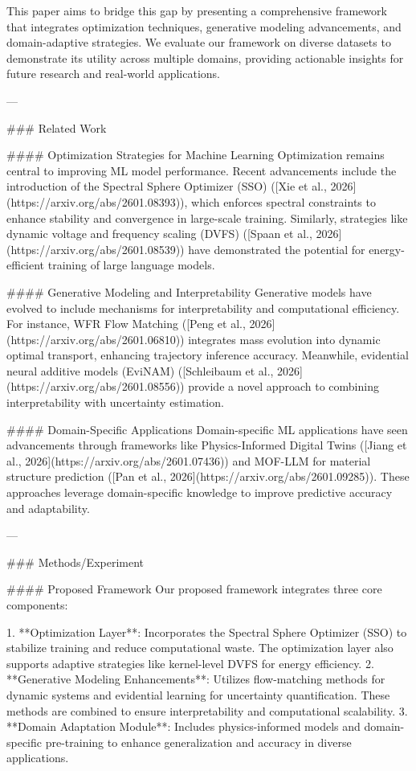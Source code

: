 This paper aims to bridge this gap by presenting a comprehensive framework that integrates optimization techniques, generative modeling advancements, and domain-adaptive strategies. We evaluate our framework on diverse datasets to demonstrate its utility across multiple domains, providing actionable insights for future research and real-world applications.

---

### Related Work

#### Optimization Strategies for Machine Learning
Optimization remains central to improving ML model performance. Recent advancements include the introduction of the Spectral Sphere Optimizer (SSO) ([Xie et al., 2026](https://arxiv.org/abs/2601.08393)), which enforces spectral constraints to enhance stability and convergence in large-scale training. Similarly, strategies like dynamic voltage and frequency scaling (DVFS) ([Spaan et al., 2026](https://arxiv.org/abs/2601.08539)) have demonstrated the potential for energy-efficient training of large language models.

#### Generative Modeling and Interpretability
Generative models have evolved to include mechanisms for interpretability and computational efficiency. For instance, WFR Flow Matching ([Peng et al., 2026](https://arxiv.org/abs/2601.06810)) integrates mass evolution into dynamic optimal transport, enhancing trajectory inference accuracy. Meanwhile, evidential neural additive models (EviNAM) ([Schleibaum et al., 2026](https://arxiv.org/abs/2601.08556)) provide a novel approach to combining interpretability with uncertainty estimation.

#### Domain-Specific Applications
Domain-specific ML applications have seen advancements through frameworks like Physics-Informed Digital Twins ([Jiang et al., 2026](https://arxiv.org/abs/2601.07436)) and MOF-LLM for material structure prediction ([Pan et al., 2026](https://arxiv.org/abs/2601.09285)). These approaches leverage domain-specific knowledge to improve predictive accuracy and adaptability.

---

### Methods/Experiment

#### Proposed Framework
Our proposed framework integrates three core components:

1. **Optimization Layer**: Incorporates the Spectral Sphere Optimizer (SSO) to stabilize training and reduce computational waste. The optimization layer also supports adaptive strategies like kernel-level DVFS for energy efficiency.
2. **Generative Modeling Enhancements**: Utilizes flow-matching methods for dynamic systems and evidential learning for uncertainty quantification. These methods are combined to ensure interpretability and computational scalability.
3. **Domain Adaptation Module**: Includes physics-informed models and domain-specific pre-training to enhance generalization and accuracy in diverse applications.

